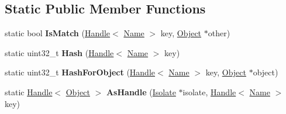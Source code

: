 \subsection*{Static Public Member Functions}
\begin{DoxyCompactItemize}
\item 
\hypertarget{classv8_1_1internal_1_1_name_dictionary_shape_aa61a249500560f11c019f04c63b842bd}{}static bool {\bfseries Is\+Match} (\hyperlink{classv8_1_1internal_1_1_handle}{Handle}$<$ \hyperlink{classv8_1_1internal_1_1_name}{Name} $>$ key, \hyperlink{classv8_1_1internal_1_1_object}{Object} $\ast$other)\label{classv8_1_1internal_1_1_name_dictionary_shape_aa61a249500560f11c019f04c63b842bd}

\item 
\hypertarget{classv8_1_1internal_1_1_name_dictionary_shape_a614cd15af545b429d62418d62018a7f1}{}static uint32\+\_\+t {\bfseries Hash} (\hyperlink{classv8_1_1internal_1_1_handle}{Handle}$<$ \hyperlink{classv8_1_1internal_1_1_name}{Name} $>$ key)\label{classv8_1_1internal_1_1_name_dictionary_shape_a614cd15af545b429d62418d62018a7f1}

\item 
\hypertarget{classv8_1_1internal_1_1_name_dictionary_shape_ae79cffa2124466834ff91ba78d9ef754}{}static uint32\+\_\+t {\bfseries Hash\+For\+Object} (\hyperlink{classv8_1_1internal_1_1_handle}{Handle}$<$ \hyperlink{classv8_1_1internal_1_1_name}{Name} $>$ key, \hyperlink{classv8_1_1internal_1_1_object}{Object} $\ast$object)\label{classv8_1_1internal_1_1_name_dictionary_shape_ae79cffa2124466834ff91ba78d9ef754}

\item 
\hypertarget{classv8_1_1internal_1_1_name_dictionary_shape_a96d68e9a269f548351734be0ae2baf31}{}static \hyperlink{classv8_1_1internal_1_1_handle}{Handle}$<$ \hyperlink{classv8_1_1internal_1_1_object}{Object} $>$ {\bfseries As\+Handle} (\hyperlink{classv8_1_1internal_1_1_isolate}{Isolate} $\ast$isolate, \hyperlink{classv8_1_1internal_1_1_handle}{Handle}$<$ \hyperlink{classv8_1_1internal_1_1_name}{Name} $>$ key)\label{classv8_1_1internal_1_1_name_dictionary_shape_a96d68e9a269f548351734be0ae2baf31}

\end{DoxyCompactItemize}
